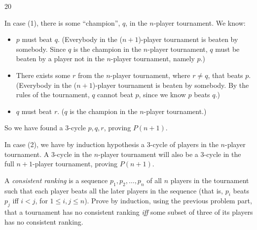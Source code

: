 \documentclass[12pt,twoside]{article}
\begin{document}
\begin{problem} {20}
\begin{problemparts}
{\vspace{0.2in}
In case (1), there is some ``champion'', $q$, in the $n$-player tournament. We know:
\begin{itemize}
\item $p$ must beat $q$. (Everybody in the ($n+1$)-player tournament is beaten by somebody. Since $q$ is the champion in the $n$-player tournament, $q$ must be beaten by a player not in the $n$-player tournament, namely $p$.)
\item There exists some $r$ from the $n$-player tournament, where $r \neq q$, that beats $p$. (Everybody in the ($n+1$)-player tournament is beaten by somebody. By the rules of the tournament, $q$ cannot beat $p$, since we know $p$ beats $q$.)
\item $q$ must beat $r$. ($q$ is the champion in the $n$-player tournament.)
\end{itemize}
So we have found a 3-cycle $p,q,r$, proving $P(n+1)$.

\vspace{0.2in}
In case (2), we have by induction hypothesis a 3-cycle of players in the
$n$-player tournament. A 3-cycle in the $n$-player tournament will
also be a 3-cycle in the full $n+1$-player tournament, proving $P(n+1)$.

\vspace{0.2in}
}

 A {\em consistent ranking} is a sequence $p_1,p_2, \ldots,
p_n$ of all $n$ players in the tournament such that each player beats all
the later players in the sequence (that is, $p_i$ beats $p_j$ iff $i < j$,
for $1 \leq i,j \leq n$). Prove by induction, using the previous problem part, that a tournament has no consistent ranking \textit{iff} some subset of three of its players has no consistent ranking.

\end{problemparts}
\end{problem}
\end{document}
